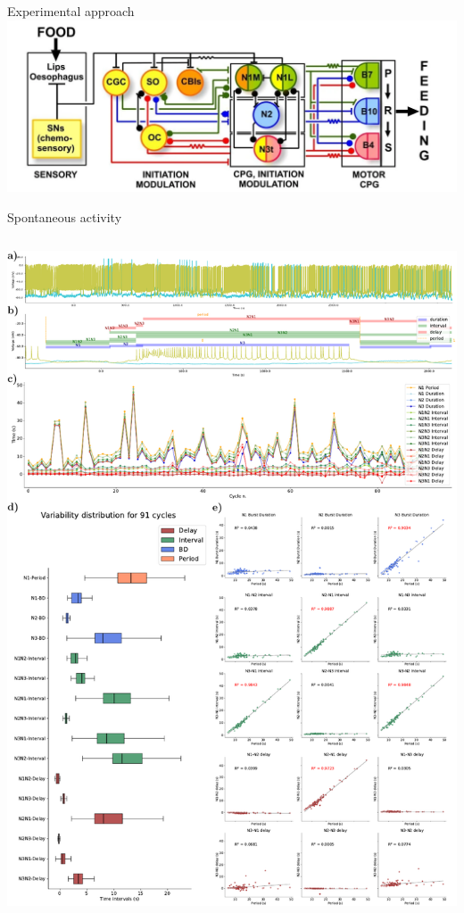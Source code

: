 \documentclass[aspectratio=43]{beamer}
\begin{document}
\begin{frame}{Experimental approach}
	\includegraphics[width=\textwidth]{invariants/distributed_benjamin_2012.png}
\end{frame}



\begin{frame}{Spontaneous activity}
	\begin{columns}
		\begin{column}{0.5\textwidth}
			\includegraphics[width=\textwidth]{invariants/data/SUSSEX/prep2/images/3phases/panel_with_intervals.pdf}

\end{column}
\end{columns}
\end{frame}
\end{document}
